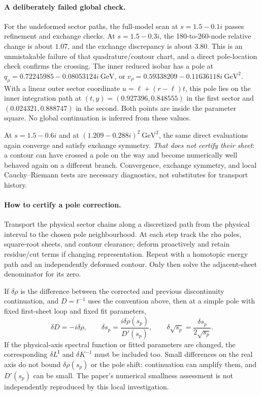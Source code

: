 \documentclass[11pt,a4paper]{article}
\begin{document}
\paragraph{A deliberately failed global check.}
For the undeformed sector paths, the full-model scan at $s=1.5-0.1i$ passes refinement and exchange checks. At $s=1.5-0.3i$, the 180-to-260-node relative change is about $1.07$, and the exchange discrepancy is about $3.80$. This is an unmistakable failure of that quadrature/contour chart, and a direct pole-location check confirms the crossing. The inner reduced isobar has a pole at $q_\rho=0.72245985-0.08053124i\ \mathrm{GeV}$, or $v_\rho=0.59338209-0.11636118i\ \mathrm{GeV}^2$. With a linear outer sector coordinate $u=\ell+(r-\ell)t$, this pole lies on the inner integration path at $(t,y)=(0.927396,0.848555)$ in the first sector and $(0.024321,0.888747)$ in the second. Both points are inside the parameter square. No global continuation is inferred from these values.

At $s=1.5-0.6i$ and at $(1.209-0.288i)^2\ \mathrm{GeV}^2$, the same direct evaluations again converge and satisfy exchange symmetry. \emph{That does not certify their sheet}: a contour can have crossed a pole on the way and become numerically well behaved again on a different branch. Convergence, exchange symmetry, and local Cauchy--Riemann tests are necessary diagnostics, not substitutes for transport history.

\paragraph{How to certify a pole correction.}
Transport the physical sector chains along a discretized path from the physical interval to the chosen pole neighbourhood. At each step track the rho poles, square-root sheets, and contour clearance; deform proactively and retain residue/cut terms if changing representation. Repeat with a homotopic energy path and an independently deformed contour. Only then solve the adjacent-sheet denominator for its zero.

If $\delta\rho$ is the difference between the corrected and previous discontinuity continuation, and $D=t^{-1}$ uses the convention above, then at a simple pole with fixed first-sheet loop and fixed fit parameters,
\begin{equation}
 \delta D=-i\delta\rho,\qquad
 \delta s_p=\frac{i\delta\rho(s_p)}{D'(s_p)},\qquad
 \delta\sqrt{s_p}=\frac{\delta s_p}{2\sqrt{s_p}}.
 \label{eq:shift}
\end{equation}
If the physical-axis spectral function or fitted parameters are changed, the corresponding $\delta L^{\mathrm I}$ and $\delta K^{-1}$ must be included too. Small differences on the real axis do not bound $\delta\rho(s_p)$ or the pole shift: continuation can amplify them, and $D'(s_p)$ can be small. The paper's numerical smallness assessment is not independently reproduced by this local investigation.
\end{document}
